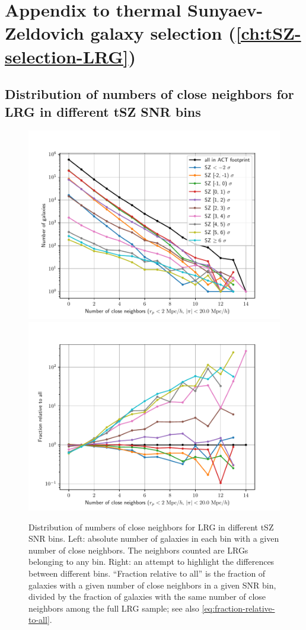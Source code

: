 \chapter{Appendix to thermal Sunyaev-Zeldovich galaxy selection\texorpdfstring{ (\cref{ch:tSZ-selection-LRG})}{}}
\graphicspath{{tSZ-selection-LRG/}}

\section{Distribution of numbers of close neighbors for LRG in different tSZ SNR bins}
\label{sec:close-neighbor-counts-dist}

\begin{figure}[htbp]
    \centering
    \includegraphics[width=0.495\linewidth]{fig/close_neighbor_counts_cylinders-Y1_rp2_pi20.0-numbers.pdf}
    \includegraphics[width=0.495\linewidth]{fig/close_neighbor_counts_cylinders-Y1_rp2_pi20.0-rel-fraction.pdf}
    \caption[Distribution of numbers of close neighbors for LRG in different tSZ SNR bins]{Distribution of numbers of close neighbors for LRG in different tSZ SNR bins.
    Left: absolute number of galaxies in each bin with a given number of close neighbors.
    The neighbors counted are LRGs belonging to any bin.
    Right: an attempt to highlight the differences between different bins.
    ``Fraction relative to all'' is the fraction of galaxies with a given number of close neighbors in a given SNR bin, divided by the fraction of galaxies with the same number of close neighbors among the full LRG sample; see also \cref{eq:fraction-relative-to-all}.}
    \label{fig:dist-no-neighbors-cylinders-SNR-bins}
\end{figure}

